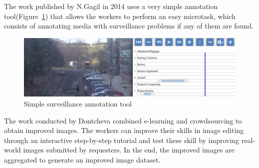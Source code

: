 The work published by N.Gagil in 2014\cite{gadgil2014web} uses a very simple annotation tool(Figure~\ref{related_d}) that allows the workers to perform an easy microtask, which consists of annotating media with surveillance problems if any of them are found.

\begin{figure}[h]
	\centerline{\includegraphics[scale=0.17] {figure/related_d}}
	\caption{Simple surveillance annotation tool\cite{gadgil2014web}}
	\label{related_d}
\end{figure} 





The work conducted by Dontcheva \cite{Dontcheva:2014:CCL:2556288.2557217} combined e-learning and crowdsourcing to obtain improved images. The workers can improve their skills in image editing through an interactive step-by-step tutorial and test these skill by improving real-world images submitted by requesters. In the end, the improved images are aggregated to generate an improved image dataset.


